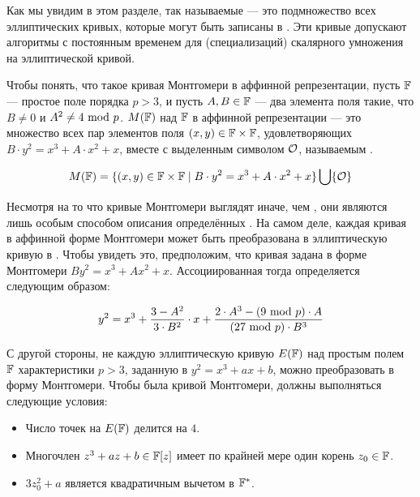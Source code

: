 Как мы увидим в этом разделе, так называемые  — это подмножество всех эллиптических кривых, которые могут быть записаны в . Эти кривые допускают алгоритмы с постоянным временем для (специализаций) скалярного умножения на эллиптической кривой. 

Чтобы понять, что такое кривая Монтгомери в аффинной репрезентации, пусть $\mathbb{F}$ — простое поле порядка $p>3$, и пусть $A,B\in \mathbb{F}$ — два элемента поля такие, что $B\neq 0$ и $A^2 \neq 4 \text{ mod } p$.  $M(\mathbb{F})$ над $\mathbb{F}$ в аффинной репрезентации — это множество всех пар элементов поля $(x,y)\in \mathbb{F}\times \mathbb{F}$, удовлетворяющих  $B\cdot y^2 = x^3 + A\cdot x^2 + x$, вместе с выделенным символом $\mathcal{O}$, называемым .

\begin{equation}
\label{eq:montgomery-curve}
M(\mathbb{F}) = \{(x,y)\in \mathbb{F}\times \mathbb{F}\;|\; B\cdot y^2 = x^3 + A\cdot x^2 + x  \} \bigcup \{\mathcal{O}\}
\end{equation}

Несмотря на то что кривые Монтгомери выглядят иначе, чем , они являются лишь особым способом описания определённых . На самом деле, каждая кривая в аффинной форме Монтгомери может быть преобразована в эллиптическую кривую в . Чтобы увидеть это, предположим, что кривая задана в форме Монтгомери $B y^2 = x^3 + A x^2 + x$. Ассоциированная  тогда определяется следующим образом:

\begin{equation}\label{eq:montgomery-to-weierstrass}
y^2 = x^3 + \frac{3-A^2}{3\cdot B^2}\cdot x + \frac{2\cdot A^3-(9 \text{ mod } p)\cdot A}{(27 \text{ mod } p)\cdot B^3}
\end{equation}

С другой стороны, не каждую эллиптическую кривую $E(\mathbb{F})$ над простым полем $\mathbb{F}$ характеристики $p>3$, заданную в  $y^2 = x^3 + a x + b$, можно преобразовать в форму Монтгомери. Чтобы  была кривой Монтгомери, должны выполняться следующие условия:

\begin{definition}\label{def:montgomery}

\begin{itemize}
\item Число точек на $E(\mathbb{F})$ делится на $4$.
\item Многочлен $z^3 + a z + b \in \mathbb{F}[z]$ имеет по крайней мере один корень $z_0\in\mathbb{F}$.
\item $3z_0^2 + a$ является квадратичным вычетом в $\mathbb{F}^*$.
\end{itemize}
\end{definition}

